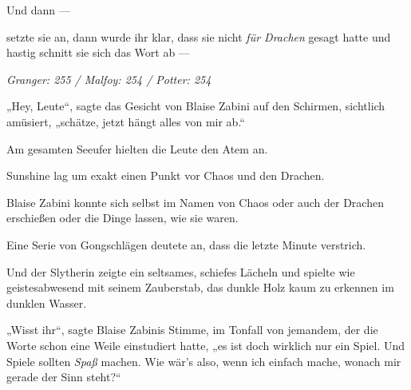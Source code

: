 Und dann —

 setzte sie an, dann wurde ihr klar, dass sie nicht \emph{für Drachen} gesagt hatte und hastig schnitt sie sich das Wort ab —

\later

\emph{Granger: 255 / Malfoy: 254 / Potter: 254}

„Hey, Leute“, sagte das Gesicht von Blaise Zabini auf den Schirmen, sichtlich amüsiert, „schätze, jetzt hängt alles von mir ab.“

Am gesamten Seeufer hielten die Leute den Atem an.

Sunshine lag um exakt einen Punkt vor Chaos und den Drachen.

Blaise Zabini konnte sich selbst im Namen von Chaos oder auch der Drachen erschießen oder die Dinge lassen, wie sie waren.

Eine Serie von Gongschlägen deutete an, dass die letzte Minute verstrich.

Und der Slytherin zeigte ein seltsames, schiefes Lächeln und spielte wie geistesabwesend mit seinem Zauberstab, das dunkle Holz kaum zu erkennen im dunklen Wasser.

„Wisst ihr“, sagte Blaise Zabinis Stimme, im Tonfall von jemandem, der die Worte schon eine Weile einstudiert hatte, „es ist doch wirklich nur ein Spiel. Und Spiele sollten \emph{Spaß} machen. Wie wär’s also, wenn ich einfach mache, wonach mir gerade der Sinn steht?“

